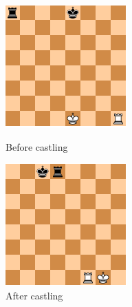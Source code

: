 \documentclass{article}
\begin{document}
\begin{figure}[!htb]
%
    \includegraphics[width=\linewidth]{before-castling}
    \caption{Before castling}\label{fig:chess7}
\endminipage\hfill
{}%
    \includegraphics[width=\linewidth]{after-castling}
    \caption{After castling}\label{fig:chess9}
\endminipage\hfill
\end{figure}
\end{document}
